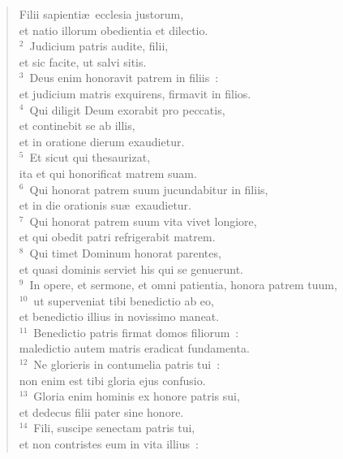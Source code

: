 \begin{flushleft}\begin{verse}\vspace{-19pt}Filii sapienti\ae\ ecclesia justorum,\\ et natio illorum obedientia et dilectio.\\
${}^{2}$~Judicium patris audite, filii,\\ et sic facite, ut salvi sitis.\\
${}^{3}$~Deus enim honoravit patrem in filiis~:\\ et judicium matris exquirens, firmavit in filios.\\
${}^{4}$~Qui diligit Deum exorabit pro peccatis,\\ et continebit se ab illis,\\ et in oratione dierum exaudietur.\\
${}^{5}$~Et sicut qui thesaurizat,\\ ita et qui honorificat matrem suam.\\
${}^{6}$~Qui honorat patrem suum jucundabitur in filiis,\\ et in die orationis su\ae\ exaudietur.\\
${}^{7}$~Qui honorat patrem suum vita vivet longiore,\\ et qui obedit patri refrigerabit matrem.\\
${}^{8}$~Qui timet Dominum honorat parentes,\\ et quasi dominis serviet his qui se genuerunt.\\
${}^{9}$~In opere, et sermone, et omni patientia, honora patrem tuum,\\
${}^{10}$~ut superveniat tibi benedictio ab eo,\\ et benedictio illius in novissimo maneat.\\
${}^{11}$~Benedictio patris firmat domos filiorum~:\\ maledictio autem matris eradicat fundamenta.\\
${}^{12}$~Ne glorieris in contumelia patris tui~:\\ non enim est tibi gloria ejus confusio.\\
${}^{13}$~Gloria enim hominis ex honore patris sui,\\ et dedecus filii pater sine honore.\\
${}^{14}$~Fili, suscipe senectam patris tui,\\ et non contristes eum in vita illius~:\\

\end{verse}
\end{flushleft}
